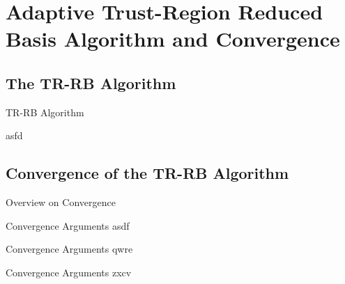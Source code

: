 \section{Adaptive Trust-Region Reduced Basis Algorithm and Convergence}

\subsection{The TR-RB Algorithm}

\begin{frame}{TR-RB Algorithm}
    \begin{algorithm}[H]
        asfd\;
    \end{algorithm}
\end{frame}

\subsection{Convergence of the TR-RB Algorithm}

\begin{frame}{Overview on Convergence}
\end{frame}

\begin{frame}{Convergence Arguments}
    asdf~\cite{Qian2017}
\end{frame}

\begin{frame}{Convergence Arguments}
    qwre~\cite{Keil2021}
\end{frame}

\begin{frame}{Convergence Arguments}
    zxcv~\cite{Banholzer2020}
\end{frame}